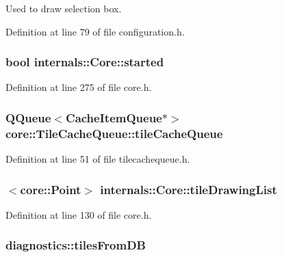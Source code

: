 Used to draw selection box. 



Definition at line 79 of file configuration.\-h.

\hypertarget{group___o_p_map_widget_ga797e80c1349c656593de207aa74935de}{
\subsubsection[{started}]{\setlength{\rightskip}{0pt plus 5cm}bool internals\-::\-Core\-::started\hspace{0.3cm}{\ttfamily [protected]}}}\label{group___o_p_map_widget_ga797e80c1349c656593de207aa74935de}


Definition at line 275 of file core.\-h.

\hypertarget{group___o_p_map_widget_ga6bb4a109ac678df86dff7fe8a1a02944}{
\subsubsection[{tile\-Cache\-Queue}]{\setlength{\rightskip}{0pt plus 5cm}Q\-Queue$<$Cache\-Item\-Queue$\ast$$>$ core\-::\-Tile\-Cache\-Queue\-::tile\-Cache\-Queue\hspace{0.3cm}{\ttfamily [protected]}}}\label{group___o_p_map_widget_ga6bb4a109ac678df86dff7fe8a1a02944}


Definition at line 51 of file tilecachequeue.\-h.

\hypertarget{group___o_p_map_widget_gaef8eae2b290cfd062061e8baaebe51d6}{
\subsubsection[{tile\-Drawing\-List}]{$<${\bf core\-::\-Point}$>$ internals\-::\-Core\-::tile\-Drawing\-List}}\label{group___o_p_map_widget_gaef8eae2b290cfd062061e8baaebe51d6}


Definition at line 130 of file core.\-h.

\hypertarget{group___o_p_map_widget_ga1a83442bf140e95b84931d57cc849449}{
\subsubsection[{tiles\-From\-D\-B}]{ diagnostics\-::tiles\-From\-D\-B}}\label{group___o_p_map_widget_ga1a83442bf140e95b84931d57cc849449}


